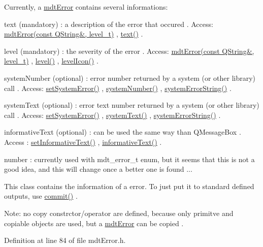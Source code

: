 Currently, a \hyperlink{classmdt_error}{mdtError} contains several informations:
\begin{DoxyItemize}
\item text (mandatory) : a description of the error that occured . Access: \hyperlink{classmdt_error_a775542a251ef746f3433e7d790a48d85}{mdtError(const QString\&, level\_\-t)} , \hyperlink{classmdt_error_a8630bb6b21b70edfe3d13eaff82a1baf}{text()} .
\item level (mandatory) : the severity of the error . Access: \hyperlink{classmdt_error_a775542a251ef746f3433e7d790a48d85}{mdtError(const QString\&, level\_\-t)} , \hyperlink{classmdt_error_a8d8382d3008de890689df415deb7766e}{level()} , \hyperlink{classmdt_error_aac5a7cec9a5d4364f9331c80e1eafe99}{levelIcon()} .
\item systemNumber (optional) : error number returned by a system (or other library) call . Access: \hyperlink{classmdt_error_a49254fdb566fee1a4adafe6a3694befc}{setSystemError()} , \hyperlink{classmdt_error_a1be3f45cd56b3142f50c288df9f53204}{systemNumber()} , \hyperlink{classmdt_error_a28d22c0b9341faacfef22a7deae2da3c}{systemErrorString()} .
\item systemText (optional) : error text number returned by a system (or other library) call . Access: \hyperlink{classmdt_error_a49254fdb566fee1a4adafe6a3694befc}{setSystemError()} , \hyperlink{classmdt_error_a6cd449e657f321b86d234269b5e92cda}{systemText()} , \hyperlink{classmdt_error_a28d22c0b9341faacfef22a7deae2da3c}{systemErrorString()} .
\item informativeText (optional) : can be used the same way than QMessageBox . Access : \hyperlink{classmdt_error_a8ef108a0502df7875f1b54bbb2a8919d}{setInformativeText()} , \hyperlink{classmdt_error_adcc1905f585c327cec8a2e31af616651}{informativeText()} .
\end{DoxyItemize}

number : currently used with mdt\_\-error\_\-t enum, but it seems that this is not a good idea, and this will change once a better one is found ...

This class contains the information of a error. To just put it to standard defined outputs, use \hyperlink{classmdt_error_ad3cccf7c7f7d4bdabdcb4e60794bb9cb}{commit()} .

Note: no copy constrctor/operator are defined, because only primitve and copiable objects are used, but a \hyperlink{classmdt_error}{mdtError} can be copied . 

Definition at line 84 of file mdtError.h.



